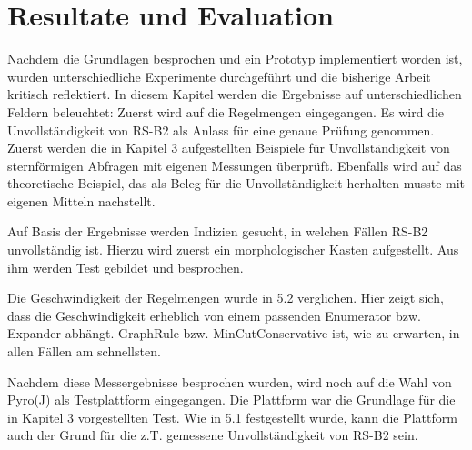 \chapter{Resultate und Evaluation}

Nachdem die Grundlagen besprochen  und ein Prototyp implementiert worden ist, wurden unterschiedliche Experimente durchgeführt und die bisherige Arbeit kritisch reflektiert. In diesem Kapitel werden die Ergebnisse auf unterschiedlichen Feldern beleuchtet: Zuerst wird auf die Regelmengen eingegangen. Es wird die Unvollständigkeit von RS-B2 als Anlass für eine genaue Prüfung genommen. Zuerst werden die in Kapitel 3 aufgestellten Beispiele für Unvollständigkeit von sternförmigen Abfragen mit eigenen Messungen überprüft. Ebenfalls wird auf das theoretische Beispiel, das als Beleg für die Unvollständigkeit herhalten musste mit eigenen Mitteln nachstellt.

Auf Basis der Ergebnisse werden Indizien gesucht, in welchen Fällen RS-B2 unvollständig ist. Hierzu wird zuerst ein morphologischer Kasten aufgestellt. Aus ihm werden Test gebildet und besprochen.


Die Geschwindigkeit der Regelmengen wurde in 5.2 verglichen. Hier zeigt sich, dass die Geschwindigkeit erheblich von einem passenden Enumerator bzw. Expander abhängt. GraphRule bzw. MinCutConservative ist, wie zu erwarten, in allen Fällen am schnellsten.

Nachdem diese Messergebnisse besprochen wurden, wird noch auf die Wahl von Pyro(J) als Testplattform eingegangen. Die Plattform war die Grundlage für die in Kapitel 3 vorgestellten Test. Wie in 5.1 festgestellt wurde, kann die Plattform auch der Grund für die z.T. gemessene Unvollständigkeit von RS-B2 sein.

















